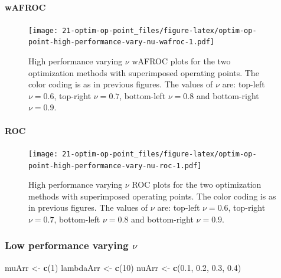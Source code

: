 \documentclass[
]{book}
\newenvironment{Shaded}{\begin{snugshade}}{\end{snugshade}}
\newcommand{\DecValTok}[1]{\textcolor[rgb]{0.00,0.00,0.81}{#1}}
\newcommand{\FloatTok}[1]{\textcolor[rgb]{0.00,0.00,0.81}{#1}}
\newcommand{\KeywordTok}[1]{\textcolor[rgb]{0.13,0.29,0.53}{\textbf{#1}}}
\newcommand{\NormalTok}[1]{#1}
\newcommand{\StringTok}[1]{\textcolor[rgb]{0.31,0.60,0.02}{#1}}
\begin{document}
\hypertarget{wafroc-9}{%
\paragraph{wAFROC}\label{wafroc-9}}

\begin{figure}
\centering
\texttt{[image: 21-optim-op-point\_files/figure-latex/optim-op-point-high-performance-vary-nu-wafroc-1.pdf]}
\caption{\label{fig:optim-op-point-high-performance-vary-nu-wafroc}High performance varying \(\nu\) wAFROC plots for the two optimization methods with superimposed operating points. The color coding is as in previous figures. The values of \(\nu\) are: top-left \(\nu = 0.6\), top-right \(\nu = 0.7\), bottom-left \(\nu = 0.8\) and bottom-right \(\nu = 0.9\).}
\end{figure}

\hypertarget{roc-9}{%
\paragraph{ROC}\label{roc-9}}

\begin{figure}
\centering
\texttt{[image: 21-optim-op-point\_files/figure-latex/optim-op-point-high-performance-vary-nu-roc-1.pdf]}
\caption{\label{fig:optim-op-point-high-performance-vary-nu-roc}High performance varying \(\nu\) ROC plots for the two optimization methods with superimposed operating points. The color coding is as in previous figures. The values of \(\nu\) are: top-left \(\nu = 0.6\), top-right \(\nu = 0.7\), bottom-left \(\nu = 0.8\) and bottom-right \(\nu = 0.9\).}
\end{figure}

\hypertarget{optim-op-point-low-performance-vary-nu}{%
\subsubsection{\texorpdfstring{Low performance varying \(\nu\)}{Low performance varying \textbackslash nu}}\label{optim-op-point-low-performance-vary-nu}}

\begin{Shaded}
\begin{Highlighting}[]
\NormalTok{muArr <-}\StringTok{ }\KeywordTok{c}\NormalTok{(}\DecValTok{1}\NormalTok{)}
\NormalTok{lambdaArr <-}\StringTok{ }\KeywordTok{c}\NormalTok{(}\DecValTok{10}\NormalTok{)}
\NormalTok{nuArr <-}\StringTok{ }\KeywordTok{c}\NormalTok{(}\FloatTok{0.1}\NormalTok{, }\FloatTok{0.2}\NormalTok{, }\FloatTok{0.3}\NormalTok{, }\FloatTok{0.4}\NormalTok{)}
\end{Highlighting}
\end{Shaded}
\end{document}
